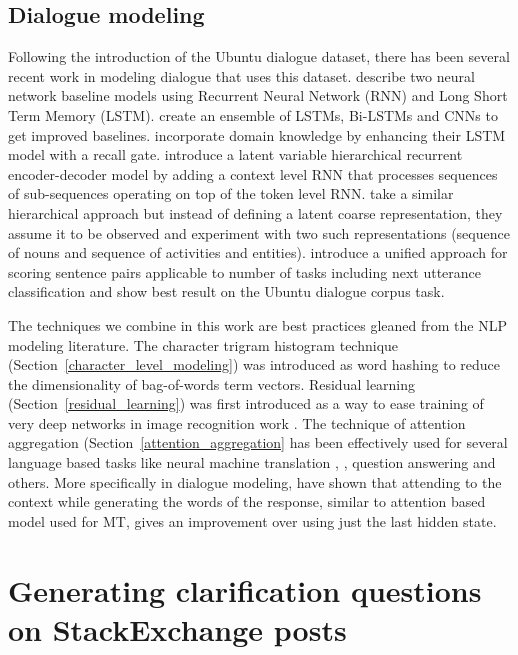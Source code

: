 \documentclass[11pt]{report}
\numberwithin{equation}{section}
\begin{document}
\section{Dialogue modeling}

Following the introduction of the Ubuntu dialogue dataset, there has been several recent work in modeling dialogue that uses this dataset. \cite{DBLP:conf/sigdial/LowePSP15} describe two neural network baseline models using Recurrent Neural Network (RNN) and Long Short Term Memory (LSTM). 
\cite{DBLP:journals/corr/KadlecSK15} create an ensemble of LSTMs, Bi-LSTMs and CNNs to get improved baselines. 
\cite{xu2016incorporating} incorporate domain knowledge by enhancing their LSTM model with a recall gate.
\cite{serban2016hierarchical} introduce a latent variable hierarchical recurrent encoder-decoder model by adding a context level RNN that processes sequences of sub-sequences operating on top of the token level RNN.
\cite{serban2016multiresolution} take a similar hierarchical approach but instead of defining a latent coarse representation, they assume it to be observed and experiment with two such representations (sequence of nouns and sequence of activities and entities).
\cite{baudivs2016sentence} introduce a unified approach for scoring sentence pairs applicable to number of tasks including next utterance classification and show best result on the Ubuntu dialogue corpus task. 

The techniques we combine in this work are best practices gleaned from the NLP modeling literature. 
The character trigram histogram technique (Section~\ref{character_level_modeling}) was introduced as word hashing \cite{DBLP:conf/cikm/HuangHGDAH13} to reduce the dimensionality of bag-of-words term vectors. Residual learning (Section~\ref{residual_learning}) was first introduced as a way to ease training of very deep networks in image recognition work \cite{he2015deep}. The technique of attention aggregation (Section~\ref{attention_aggregation} has been effectively used for several language based tasks like neural machine translation \cite{DBLP:journals/corr/BahdanauCB14}, \cite{DBLP:conf/emnlp/LuongPM15}, question answering \cite{} and others. More specifically in dialogue modeling, \cite{DBLP:journals/corr/YaoPZW16} have shown that attending to the context while generating the words of the response, similar to attention based model used for MT, gives an improvement over using just the last hidden state.


\newpage

\chapter{Generating clarification questions on StackExchange posts}
\end{document}
